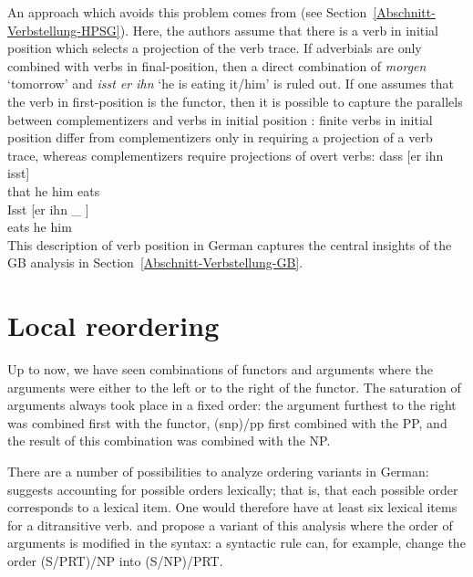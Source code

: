 \zl
An approach which avoids this problem comes from \citet{KW91a} (see
Section~\ref{Abschnitt-Verbstellung-HPSG}). Here, the authors assume that there is a verb in initial
position which selects a projection of the verb trace. If adverbials are only combined with verbs in
final-position, then a direct combination of \emph{morgen} `tomorrow' and \emph{isst er ihn} `he is eating
it/him' is ruled out. If one assumes that the verb in first-position is the functor, then it is possible to capture the
parallels between complementizers and verbs in initial position
\citep{Hoehle97a}: finite verbs in initial position differ from complementizers only in requiring
a projection of a verb trace, whereas complementizers require projections of overt verbs: 
\eal
\ex 
\gll dass [er ihn isst]\\
     that \spacebr{}he him eats\\
\ex 
\gll Isst [er ihn \_ ]\\
     eats \spacebr{}he him\\
\zl
This description of verb position in German captures the central insights of the GB analysis in Section~\ref{Abschnitt-Verbstellung-GB}.

\section{Local reordering}
\label{Abschnitt-CG-lokale-Umstellung}

Up to now, we have seen combinations of functors and arguments where the
arguments were either to the left or to the right of the functor. The saturation of arguments always
took place in a fixed order: the argument furthest to the right was combined first with the functor,
\eg (s\bs np)/pp first combined with the PP, and the result of this combination was combined with
the NP.

There are a number of possibilities to analyze ordering variants in German: \citet{Uszkoreit86b}
suggests accounting for possible orders lexically; that is, that each possible order corresponds to
a lexical item. One would therefore have at least six lexical items for a ditransitive
verb. \citet[]{Briscoe2000a} and \citet[--98]{Villavicencio2002a} propose a variant
of this analysis where the order of arguments is modified in the syntax: a syntactic rule can, for
example, change the order (S/PRT)/NP into (S/NP)/PRT.

